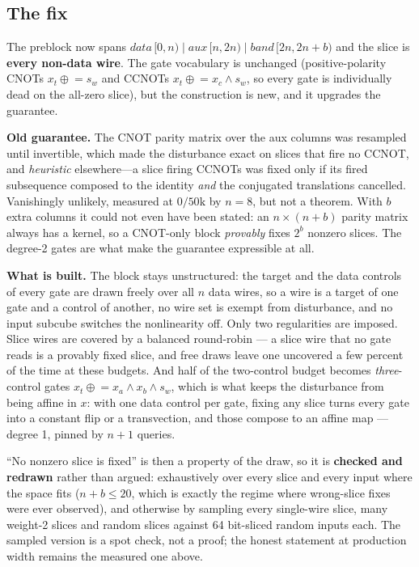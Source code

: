 \documentclass[11pt]{article}
\newcommand{\xor}{\oplus}
\begin{document}
\subsection{The fix}

The preblock now spans $\mathit{data}\,[0,n) \mid \mathit{aux}\,[n,2n) \mid
\mathit{band}\,[2n,2n{+}b)$ and the slice is \textbf{every non-data wire}. The
gate vocabulary is unchanged (positive-polarity CNOTs $x_t \mathrel{\xor}= s_w$
and CCNOTs $x_t \mathrel{\xor}= x_c \wedge s_w$, so every gate is individually
dead on the all-zero slice), but the construction is new, and it upgrades the
guarantee.

\textbf{Old guarantee.} The CNOT parity matrix over the aux columns was
resampled until invertible, which made the disturbance exact on slices that fire
no CCNOT, and \emph{heuristic} elsewhere---a slice firing CCNOTs was fixed only
if its fired subsequence composed to the identity \emph{and} the conjugated
translations cancelled. Vanishingly unlikely, measured at $0/50\mathrm{k}$ by
$n{=}8$, but not a theorem. With $b$ extra columns it could not even have been
stated: an $n\times(n{+}b)$ parity matrix always has a kernel, so a CNOT-only
block \emph{provably} fixes $2^{b}$ nonzero slices. The degree-2 gates are what
make the guarantee expressible at all.

\textbf{What is built.} The block stays unstructured: the target and the data
controls of every gate are drawn freely over all $n$ data wires, so a wire is a
target of one gate and a control of another, no wire set is exempt from
disturbance, and no input subcube switches the nonlinearity off. Only two
regularities are imposed. Slice wires are covered by a balanced round-robin ---
a slice wire that no gate reads is a provably fixed slice, and free draws leave
one uncovered a few percent of the time at these budgets. And half of the
two-control budget becomes \emph{three}-control gates
$x_t \mathrel{\xor}= x_a \wedge x_b \wedge s_w$, which is what keeps the
disturbance from being affine in $x$: with one data control per gate, fixing any
slice turns every gate into a constant flip or a transvection, and those compose
to an affine map --- degree 1, pinned by $n{+}1$ queries.

``No nonzero slice is fixed'' is then a property of the draw, so it is
\textbf{checked and redrawn} rather than argued: exhaustively over every slice
and every input where the space fits ($n+b \le 20$, which is exactly the regime
where wrong-slice fixes were ever observed), and otherwise by sampling every
single-wire slice, many weight-2 slices and random slices against 64 bit-sliced
random inputs each. The sampled version is a spot check, not a proof; the honest
statement at production width remains the measured one above.
\end{document}
